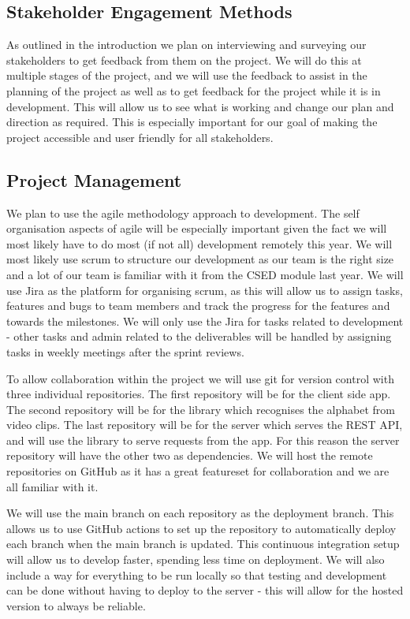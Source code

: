 \documentclass[10pt]{article}
\begin{document}
\subsection{Stakeholder Engagement Methods}

As outlined in the introduction we plan on interviewing and surveying our stakeholders to get feedback from them on the project. We will do this at multiple stages of the project, and we will use the feedback to assist in the planning of the project as well as to get feedback for the project while it is in development. This will allow us to see what is working and change our plan and direction as required. This is especially important for our goal of making the project accessible and user friendly for all stakeholders.

\subsection{Project Management}

We plan to use the agile methodology approach to development. The self organisation aspects of agile will be especially important given the fact we will most likely have to do most (if not all) development remotely this year. We will most likely use scrum to structure our development as our team is the right size and a lot of our team is familiar with it from the CSED module last year.  We will use Jira as the platform for organising scrum, as this will allow us to assign tasks, features and bugs to team members and track the progress for the features and towards the milestones. We will only use the Jira for tasks related to development - other tasks and admin related to the deliverables will be handled by assigning tasks in weekly meetings after the sprint reviews.

To allow collaboration within the project we will use git for version control with three individual repositories. The first repository will be for the client side app. The second repository will be for the library which recognises the alphabet from video clips. The last repository will be for the server which serves the REST API, and will use the library to serve requests from the app. For this reason the server repository will have the other two as dependencies. We will host the remote repositories on GitHub as it has a great featureset for collaboration and we are all familiar with it.

We will use the main branch on each repository as the deployment branch. This allows us to use GitHub actions to set up the repository to automatically deploy each branch when the main branch is updated. This continuous integration setup will allow us to develop faster, spending less time on deployment. We will also include a way for everything to be run locally so that testing and development can be done without having to deploy to the server - this will allow for the hosted version to always be reliable.
\end{document}
